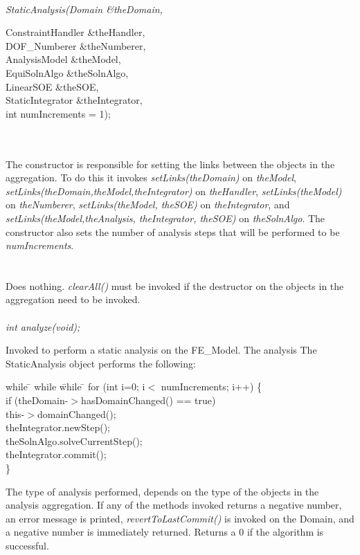  \\
{\em StaticAnalysis(Domain \&theDomain, 

\indent\indent\indent\indent\indent ConstraintHandler \&theHandler, \\
\indent\indent\indent\indent\indent DOF\_Numberer \&theNumberer, \\
\indent\indent\indent\indent\indent AnalysisModel \&theModel,\\
\indent\indent\indent\indent\indent EquiSolnAlgo \&theSolnAlgo,\\
\indent\indent\indent\indent\indent LinearSOE \&theSOE, \\
\indent\indent\indent\indent\indent StaticIntegrator \&theIntegrator, \\
\indent\indent\indent\indent\indent int numIncrements = 1);} \\ \\
The constructor is responsible for setting the links between the
objects in the aggregation. To do this it invokes {\em
setLinks(theDomain)} on {\em theModel}, {\em
setLinks(theDomain,theModel,theIntegrator)} on {\em theHandler}, 
{\em setLinks(theModel)} on {\em theNumberer}, {\em
setLinks(theModel, theSOE)} on {\em theIntegrator}, and  {\em
setLinks(theModel,theAnalysis, theIntegrator, theSOE)} on {\em
theSolnAlgo}.  The constructor also sets the number of analysis steps
that will be performed to be {\em numIncrements}.\\


 \\
\\ 
Does nothing. {\em clearAll()} must be invoked if the destructor on
the objects in the aggregation need to be invoked. \\

\\
{\em int analyze(void);} 

Invoked to perform a static analysis on the FE\_Model. The analysis 
The StaticAnalysis object performs the following:
\begin{tabbing}
while \= \+ while \= while \= \kill
    for (int i=0; i$<$ numIncrements; i++) \{ \+ \\
    if (theDomain-$>$hasDomainChanged() == true) \+\\
	this-$>$domainChanged(); \- \\
    theIntegrator.newStep(); \\
    theSolnAlgo.solveCurrentStep(); \\
    theIntegrator.commit(); \- \\ \} \\
\end{tabbing}
\noindent The type of analysis performed, depends on the type of the
objects in the analysis aggregation. If any of the methods invoked
returns a negative number, an error message is printed, {\em
revertToLastCommit()} is invoked on the Domain, and a negative number
is immediately returned. Returns a $0$ if the algorithm is successful. \\


